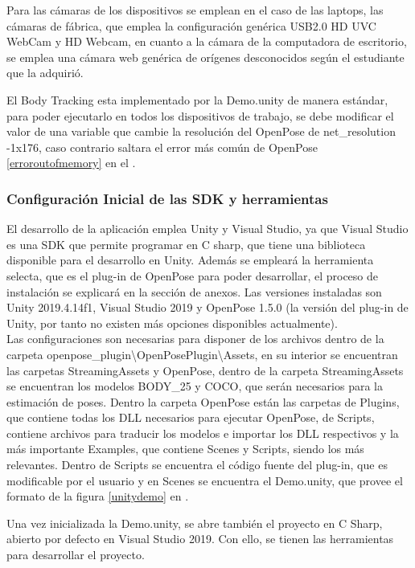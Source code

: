 Para las cámaras de los dispositivos se emplean en el caso de las laptops, las cámaras de fábrica, que emplea la configuración genérica USB2.0 HD UVC WebCam y HD Webcam, en cuanto a la cámara de la computadora de escritorio, se emplea una cámara web genérica de orígenes desconocidos según el estudiante que la adquirió. 

El Body Tracking esta implementado por la Demo.unity de manera estándar, para poder ejecutarlo en todos los dispositivos de trabajo, se debe modificar el valor de una variable que cambie la resolución del OpenPose de net\_resolution -1x176, caso contrario saltara el error más común de OpenPose \ref{erroroutofmemory} en el .


\subsubsection{Configuración Inicial de las SDK y herramientas}

El desarrollo de la aplicación emplea Unity y Visual Studio, ya que Visual Studio es una SDK que permite programar en C sharp, que tiene una biblioteca disponible para el desarrollo en Unity. Además se empleará la herramienta selecta, que es el plug-in de OpenPose para poder desarrollar, el proceso de instalación se explicará en la sección de anexos. Las versiones instaladas son Unity 2019.4.14f1, Visual Studio 2019 y OpenPose 1.5.0 (la versión del plug-in de Unity, por tanto no existen más opciones disponibles actualmente).
\\
Las configuraciones son necesarias para disponer de los archivos dentro de la carpeta openpose\_plugin\textbackslash OpenPosePlugin\textbackslash Assets, en su interior se encuentran las carpetas StreamingAssets y OpenPose, dentro de la carpeta StreamingAssets se encuentran los modelos BODY\_25 y COCO, que serán necesarios para la estimación de poses. Dentro la carpeta OpenPose están las carpetas de Plugins, que contiene todas los DLL necesarios para ejecutar OpenPose, de Scripts, contiene archivos para traducir los modelos e importar los DLL respectivos y la más importante Examples, que contiene Scenes y Scripts, siendo los más relevantes. Dentro de Scripts se encuentra el código fuente del plug-in, que es modificable por el usuario y en Scenes se encuentra el Demo.unity, que provee el formato de la figura \ref{unitydemo} en .

Una vez inicializada la Demo.unity, se abre también el proyecto en C Sharp, abierto por defecto en Visual Studio 2019. Con ello, se tienen las herramientas para desarrollar el proyecto.


